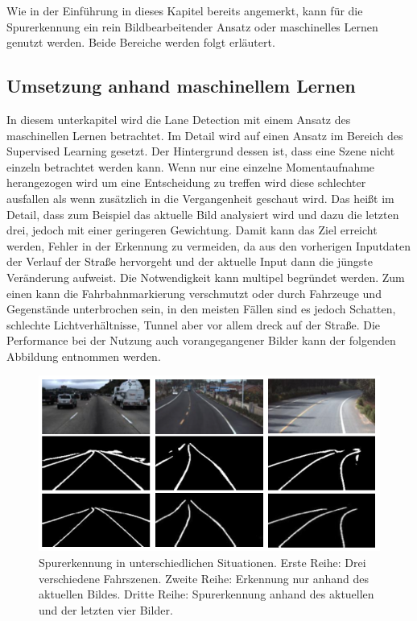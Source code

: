 Wie in der Einführung in dieses Kapitel bereits angemerkt, kann für die Spurerkennung ein rein Bildbearbeitender Ansatz oder maschinelles Lernen genutzt werden. Beide Bereiche werden folgt erläutert.

\subsection{Umsetzung anhand maschinellem Lernen}
In diesem unterkapitel wird die Lane Detection mit einem Ansatz des maschinellen Lernen betrachtet. Im Detail wird auf einen Ansatz im Bereich des Supervised Learning gesetzt.
Der Hintergrund dessen ist, dass eine Szene nicht einzeln betrachtet werden kann. Wenn nur eine einzelne Momentaufnahme herangezogen wird um eine Entscheidung zu treffen wird diese schlechter ausfallen als wenn zusätzlich in die Vergangenheit geschaut wird. \cite{cnnld_2020}
Das heißt im Detail, dass zum Beispiel das aktuelle Bild analysiert wird und dazu die letzten drei, jedoch mit einer geringeren Gewichtung. Damit kann das Ziel erreicht werden, Fehler in der Erkennung zu vermeiden, da aus den vorherigen Inputdaten der Verlauf der Straße hervorgeht und der aktuelle Input dann die jüngste Veränderung aufweist. Die Notwendigkeit kann multipel begründet werden. Zum einen kann die Fahrbahnmarkierung verschmutzt oder durch Fahrzeuge und Gegenstände unterbrochen sein, in den meisten Fällen sind es jedoch Schatten, schlechte Lichtverhältnisse, Tunnel aber vor allem dreck auf der Straße.
Die Performance bei der Nutzung auch vorangegangener Bilder kann der folgenden Abbildung entnommen werden.

\begin{figure}[H]
    \centering
    \includegraphics[scale=0.8]{./img/LD_challenging_situations.png}
    \caption{Spurerkennung in unterschiedlichen  Situationen. Erste Reihe: Drei verschiedene Fahrszenen. Zweite Reihe: Erkennung nur anhand des aktuellen Bildes. Dritte Reihe: Spurerkennung anhand des aktuellen und der letzten vier Bilder. \cite[S.1]{cnnld_2020}}
    \label{fig:LDchallenge}
\end{figure}


